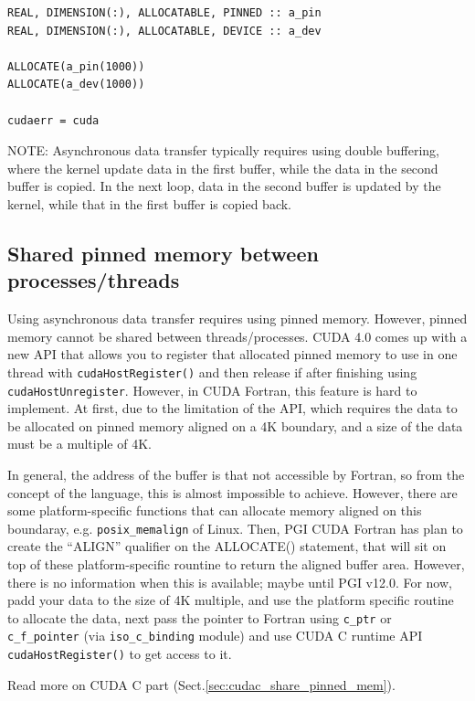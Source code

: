 \begin{lstlisting}
REAL, DIMENSION(:), ALLOCATABLE, PINNED :: a_pin
REAL, DIMENSION(:), ALLOCATABLE, DEVICE :: a_dev

ALLOCATE(a_pin(1000))
ALLOCATE(a_dev(1000))

cudaerr = cuda
\end{lstlisting}

NOTE: Asynchronous data transfer typically requires using double buffering,
where the kernel update data in the first buffer, while the data in the second
buffer is copied. In the next loop, data in the second buffer is updated by the
kernel, while that in the first buffer is copied back. 

\subsection{Shared pinned memory between processes/threads}
\label{sec:cudaf_shared_pinned_mem}

Using asynchronous data transfer requires using pinned memory. However, pinned
memory cannot be shared between threads/processes. CUDA 4.0 comes up with a new
API that allows you to register that allocated pinned memory to use in one
thread with \verb!cudaHostRegister()! and then release if after finishing using
\verb!cudaHostUnregister!. However, in CUDA Fortran, this feature is hard to
implement. At first, due to the limitation of the API, which requires the data
to be allocated on pinned memory aligned on a 4K boundary, and a size of the
data must be a multiple of 4K. 

In general, the address of the buffer is that not accessible by Fortran, so from
the concept of the language, this is almost impossible to achieve. However,
there are some platform-specific functions that can allocate memory aligned on
this boundaray, e.g. \verb!posix_memalign! of Linux. Then, PGI CUDA Fortran has
plan to create the ``ALIGN'' qualifier on the ALLOCATE() statement, that will
sit on top of these platform-specific rountine to return the aligned buffer
area. However, there is no information when this is available; maybe until PGI
v12.0. For now, padd your data to the size of 4K multiple, and use the platform
specific routine to allocate the data, next pass the pointer to Fortran
using \verb!c_ptr! or \verb!c_f_pointer! (via \verb!iso_c_binding! module) and
use CUDA C runtime API \verb!cudaHostRegister()! to get access to it. 

Read more on CUDA C part (Sect.\ref{sec:cudac_share_pinned_mem}).


